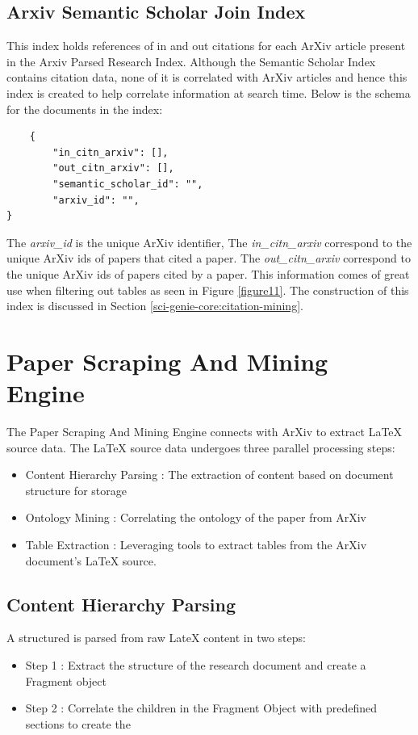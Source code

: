 \subsection{Arxiv Semantic Scholar Join Index}
\label{sci-genie-core:data-layer:ss-join-index}
This index holds references of in and out citations for each ArXiv article present in the Arxiv Parsed Research Index. Although the Semantic Scholar Index contains citation data, none of it is correlated with ArXiv articles and hence this index is created to help correlate information at search time. Below is the schema for the documents in the index: 
\begin{verbatim}
    {
        "in_citn_arxiv": [],
        "out_citn_arxiv": [],
        "semantic_scholar_id": "",
        "arxiv_id": "",
}
\end{verbatim}
The \textit{arxiv\_id} is the unique ArXiv identifier, The \textit{in\_citn\_arxiv} correspond to the unique ArXiv ids of papers that cited a paper. The \textit{out\_citn\_arxiv} correspond to the unique ArXiv ids of papers cited by a paper. This information comes of great use when filtering out tables as seen in Figure \ref{figure11}. The construction of this index is discussed in Section \ref{sci-genie-core:citation-mining}.
\section{Paper Scraping And Mining Engine}
\label{sci-genie-core:scraping}
The Paper Scraping And Mining Engine connects with ArXiv to extract LaTeX source data. The LaTeX source data undergoes three parallel processing steps:
\begin{itemize}
    \item Content Hierarchy Parsing : The extraction of content based on document structure for storage
    \item Ontology Mining : Correlating the ontology of the paper from ArXiv
    \item Table Extraction : Leveraging tools to extract tables from the ArXiv document's LaTeX source.
\end{itemize}

\subsection{Content Hierarchy Parsing}
A structured  is parsed from raw LateX content in two steps:
\begin{itemize}
    \item Step 1 : Extract the structure of the research document and create a Fragment object
    \item Step 2 : Correlate the children in the Fragment Object with predefined sections to create the  
\end{itemize} 
